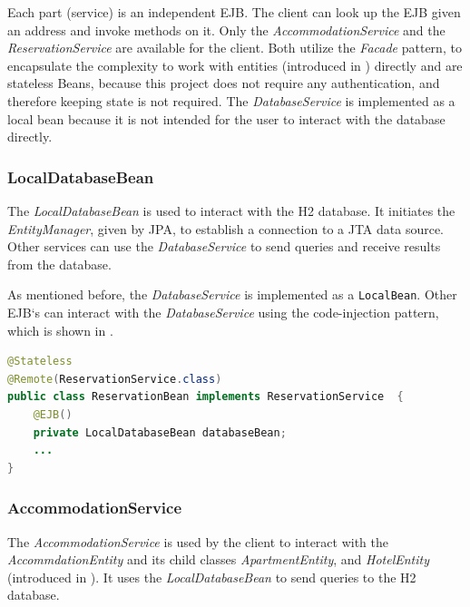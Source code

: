 Each part (service) is an independent EJB. The client can look up the EJB given an address and invoke methods on it. Only the \textit{AccommodationService} and the \textit{ReservationService} are available for the client. Both utilize the \textit{Facade} pattern, to encapsulate the complexity to work with entities (introduced in ) directly and are stateless Beans, because this project does not require any authentication, and therefore keeping state is not required. The \textit{DatabaseService} is implemented as a local bean because it is not intended for the user to interact with the database directly.


\subsubsection{LocalDatabaseBean}\label{sec:02_design_beans_local}
The \textit{LocalDatabaseBean} is used to interact with the H2 database. It initiates the \textit{EntityManager}, given by JPA, to establish a connection to a JTA data source. Other services can use the \textit{DatabaseService} to send queries and receive results from the database.

As mentioned before, the \textit{DatabaseService} is implemented as a \texttt{LocalBean}. Other EJB`s can interact with the \textit{DatabaseService} using the code-injection pattern, which is shown in .
\begin{lstlisting}[label=lst:02_design_ejb_db_cinjection, caption=Usage of the \textit{LocalDatabaseBean} using code-injection, language=java]
@Stateless
@Remote(ReservationService.class)
public class ReservationBean implements ReservationService  {
    @EJB()
    private LocalDatabaseBean databaseBean;
    ...
}
\end{lstlisting}


\subsubsection{AccommodationService}\label{sec:02_design_beans_acc}
The \textit{AccommodationService} is used by the client to interact with the \textit{AccommdationEntity} and its child classes \textit{ApartmentEntity}, and \textit{HotelEntity} (introduced in ). It uses the \textit{LocalDatabaseBean} to send queries to the H2 database.

